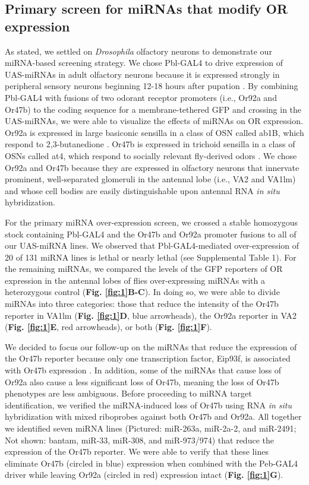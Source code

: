 \subsection*{Primary screen for miRNAs that modify OR expression}

As stated, we settled on \emph{Drosophila} olfactory neurons to demonstrate our miRNA-based screening strategy.
We chose Pbl-GAL4 to drive expression of UAS-miRNAs in adult olfactory neurons because it is expressed strongly in peripheral sensory neurons beginning 12-18 hours after pupation \cite{dnik_Dickson_Luo_Komiyama_2007}.
By combining Pbl-GAL4 with fusions of two odorant receptor promoters (i.e., Or92a and Or47b) to the coding sequence for a membrane-tethered GFP and crossing in the UAS-miRNAs, we were able to visualize the effects of miRNAs on OR expression.
Or92a is expressed in large basiconic sensilla in a class of OSN called ab1B, which respond to 2,3-butanedione \cite{de_Bruyne_Foster_Carlson_2001}.
Or47b is expressed in trichoid sensilla in a class of OSNs called at4, which respond to socially relevant fly-derived odors \cite{vanderGoesvanNaters:2007cq}.
We chose Or92a and Or47b because they are expressed in olfactory neurons that innervate prominent, well-separated glomeruli in the antennal lobe (i.e., VA2 and VA1lm) and whose cell bodies are easily distinguishable upon antennal RNA \emph{in situ} hybridization.

For the primary miRNA over-expression screen, we crossed a stable homozygous stock containing Pbl-GAL4 and the Or47b and Or92a promoter fusions to all of our UAS-miRNA lines.
We observed that Pbl-GAL4-mediated over-expression of 20 of 131 miRNA lines is lethal or nearly lethal (see Supplemental Table 1).
For the remaining miRNAs, we compared the levels of the GFP reporters of OR expression in the antennal lobes of flies over-expressing miRNAs with a heterozygous control (\textbf{Fig. \ref{fig:1}B-C}).
In doing so, we were able to divide miRNAs into three categories: those that reduce the intensity of the Or47b reporter in VA1lm (\textbf{Fig. \ref{fig:1}D}, blue arrowheads), the Or92a reporter in VA2 (\textbf{Fig. \ref{fig:1}E}, red arrowheads), or both (\textbf{Fig. \ref{fig:1}F}).

We decided to focus our follow-up on the miRNAs that reduce the expression of the Or47b reporter because only one transcription factor, Eip93f, is associated with Or47b expression \cite{Brochtrup_Hummel_Alenius_2012}.
In addition, some of the miRNAs that cause loss of Or92a also cause a less significant loss of Or47b, meaning the loss of Or47b phenotypes are less ambiguous.
Before proceeding to miRNA target identification, we verified the miRNA-induced loss of Or47b using RNA \emph{in situ} hybridization with mixed riboprobes against both Or47b and Or92a.
All together we identified seven miRNA lines (Pictured: miR-263a, miR-2a-2, and miR-2491; Not shown: bantam, miR-33, miR-308, and miR-973/974) that reduce the expression of the Or47b reporter.
We were able to verify that these lines eliminate Or47b (circled in blue) expression when combined with the Peb-GAL4 driver while leaving Or92a (circled in red) expression intact (\textbf{Fig. \ref{fig:1}G}).
